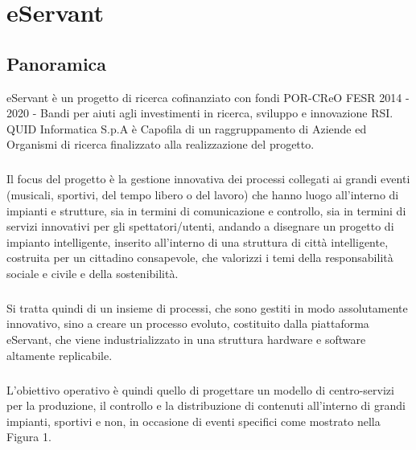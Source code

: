 \chapter{eServant}

\section{Panoramica}
eServant è un progetto di ricerca cofinanziato con fondi POR-CReO FESR 2014 - 2020 - Bandi per aiuti agli investimenti in ricerca, sviluppo e innovazione RSI. QUID Informatica S.p.A è Capofila di un raggruppamento di Aziende ed Organismi di ricerca finalizzato alla realizzazione del progetto.
\paragraph{}

Il focus del progetto è la gestione innovativa dei processi collegati ai grandi eventi (musicali, sportivi, del tempo libero o del lavoro) che hanno luogo all’interno di impianti e strutture, sia in termini di comunicazione e controllo, sia in termini di servizi innovativi per gli spettatori/utenti, andando a disegnare un progetto di impianto intelligente, inserito all’interno di una struttura di città intelligente, costruita per un cittadino consapevole, che valorizzi i temi della responsabilità sociale e civile e  della sostenibilità.
\paragraph{}

Si tratta quindi di un insieme di processi, che sono gestiti in modo assolutamente innovativo, sino a creare un processo evoluto, costituito dalla piattaforma eServant, che viene industrializzato in una struttura hardware e software altamente replicabile.
\paragraph{}

L’obiettivo operativo è quindi quello di progettare un modello di centro-servizi per la produzione, il controllo e la distribuzione di contenuti all’interno di grandi impianti, sportivi e non, in occasione di eventi specifici come mostrato nella Figura 1.
\paragraph{}

